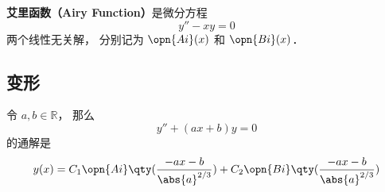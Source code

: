 
\begin{issues}
\issueDraft
\end{issues}

\textbf{艾里函数（Airy Function）}是微分方程
\begin{equation}
y'' - xy = 0
\end{equation}
两个线性无关解， 分别记为 $\opn{Ai}(x)$ 和 $\opn{Bi}(x)$．


\subsection{变形}
令 $a, b\in \mathbb R$， 那么
\begin{equation}
y'' + (ax + b) y = 0
\end{equation}
的通解是
\begin{equation}\label{AiryF_eq1}
y(x) = C_1\opn{Ai}\qty(\frac{-ax-b}{\abs{a}^{2/3}}) + C_2 \opn{Bi}\qty(\frac{-ax-b}{\abs{a}^{2/3}})
\end{equation}
